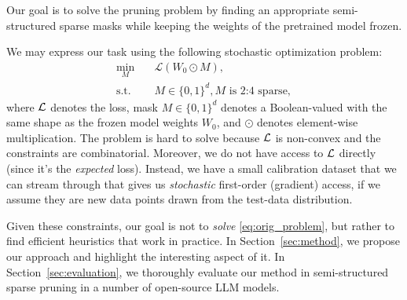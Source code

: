 Our goal is to solve the pruning problem by finding an appropriate semi-structured sparse masks while keeping the weights of the pretrained model frozen. 

We may express our task using the following stochastic optimization problem:
\begin{equation}\label{eq:orig_problem}
\begin{aligned}
\min_{M} &\quad \mathcal{L}(W_0 \odot M), \\
\text{s.t.} &\quad M \in \{0, 1\}^{d},  M \text{ is 2:4 sparse}, %
\end{aligned}
\end{equation}
where $\mathcal{L}$ denotes the loss, mask $M\in\{0,1\}^d$ denotes a Boolean-valued with the same shape as the frozen model weights $W_{0}$, and $\odot$ denotes element-wise multiplication.
The problem is hard to solve because $\mathcal{L}$ is non-convex and the constraints are combinatorial. Moreover, we do not have access to $\mathcal{L}$ directly (since it's the \emph{expected} loss). Instead, we have a small calibration dataset that we can stream through that gives us \emph{stochastic} first-order (gradient) access, if we assume they are new data points drawn from the test-data distribution. 

Given these constraints, our goal is not to \emph{solve} \eqref{eq:orig_problem}, but rather to find efficient heuristics that work in practice. In Section~\ref{sec:method}, we propose our approach and highlight the interesting aspect of it. In Section~\ref{sec:evaluation}, we thoroughly evaluate our method in semi-structured sparse pruning in a number of open-source LLM models.
%

